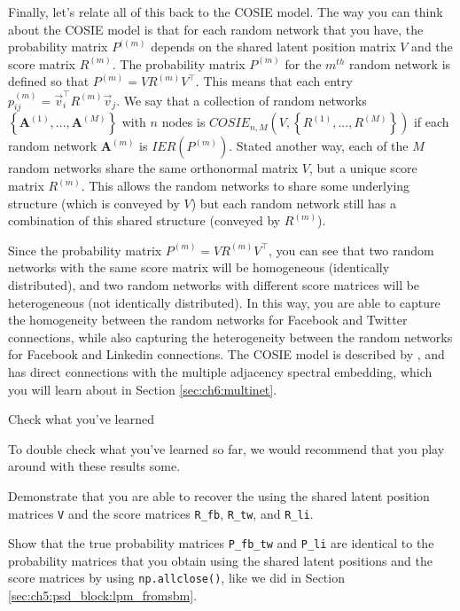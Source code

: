 Finally, let's relate all of this back to the COSIE model. The way you can think about the COSIE model is that for each random network that you have, the probability matrix $P^{((m)}$ depends on the shared latent position matrix $V$ and the score matrix $R^{(m)}$. The probability matrix $P^{(m)}$ for the $m^{th}$ random network is defined so that $P^{(m)} = VR^{(m)}V^\top$. This means that each entry $p_{ij}^{(m)} = \vec v_i^\top R^{(m)} \vec v_j$. We say that a collection of random networks $\left\{\mathbf A^{(1)}, ..., \mathbf A^{(M)}\right\}$ with $n$ nodes is $COSIE_{n,M}\left(V, \left\{R^{(1)},...,R^{(M)}\right\}\right)$ if each random network $\mathbf A^{(m)}$ is $IER(P^{(m)})$. Stated another way, each of the $M$ random networks share the same orthonormal matrix $V$, but a unique score matrix $R^{(m)}$. This allows the random networks to share some underlying structure (which is conveyed by $V$) but each random network still has a combination of this shared structure (conveyed by $R^{(m)}$). 

Since the probability matrix $P^{(m)} = VR^{(m)}V^\top$, you can see that two random networks with the same score matrix will be homogeneous (identically distributed), and two random networks with different score matrices will be heterogeneous (not identically distributed). In this way, you are able to capture the homogeneity between the random networks for Facebook and Twitter connections, while also capturing the heterogeneity between the random networks for Facebook and Linkedin connections. The COSIE model is described by \cite{Arroyo2021}, and has direct connections with the multiple adjacency spectral embedding, which you will learn about in Section \ref{sec:ch6:multinet}.

\begin{floatingbox}[h]\caption{Check what you've learned}
To double check what you've learned so far, we would recommend that you play around with these results some. 

Demonstrate that you are able to recover the using the shared latent position matrices \texttt{V} and the score matrices \texttt{R\_fb}, \texttt{R\_tw}, and \texttt{R\_li}. 

Show that the true probability matrices \texttt{P\_fb\_tw} and \texttt{P\_li} are identical to the probability matrices that you obtain using the shared latent positions and the score matrices by using \texttt{np.allclose()}, like we did in Section \ref{sec:ch5:psd_block:lpm_fromsbm}.
\end{floatingbox}

